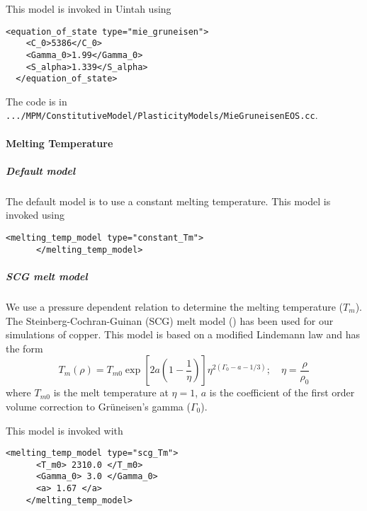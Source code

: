 This model is invoked in Uintah using
\begin{Verbatim}[fontsize=\footnotesize]
  <equation_of_state type="mie_gruneisen">
    <C_0>5386</C_0>
    <Gamma_0>1.99</Gamma_0>
    <S_alpha>1.339</S_alpha>
  </equation_of_state>
\end{Verbatim}
The code is in \verb|.../MPM/ConstitutiveModel/PlasticityModels/MieGruneisenEOS.cc|.

\paragraph{Melting Temperature}
  \subparagraph{Default model}
  The default model is to use a constant melting temperature.  This model
  is invoked using
  \begin{Verbatim}[fontsize=\footnotesize]  
      <melting_temp_model type="constant_Tm">
      </melting_temp_model>
  \end{Verbatim}

  \subparagraph{SCG melt model}
  We use a pressure dependent relation to determine the melting
  temperature ($T_m$).  The Steinberg-Cochran-Guinan (SCG) melt model
  (\cite{Steinberg80}) has been used for our simulations of copper.
  This model is based on a modified Lindemann law and has the form
  \begin{equation} \label{eq:TmSCG}
    T_m(\rho) = T_{m0} \exp\left[2a\left(1-\frac{1}{\eta}\right)\right]
              \eta^{2(\Gamma_0-a-1/3)}; \quad
    \eta = \frac{\rho}{\rho_0}
  \end{equation}
  where $T_{m0}$ is the melt temperature at $\eta = 1$,
  $a$ is the coefficient of the first order volume correction to
  Gr{\"u}neisen's gamma ($\Gamma_0$).

  This model is invoked with
  \begin{Verbatim}[fontsize=\footnotesize]
    <melting_temp_model type="scg_Tm">
      <T_m0> 2310.0 </T_m0>
      <Gamma_0> 3.0 </Gamma_0>
      <a> 1.67 </a>
    </melting_temp_model>
  \end{Verbatim}

